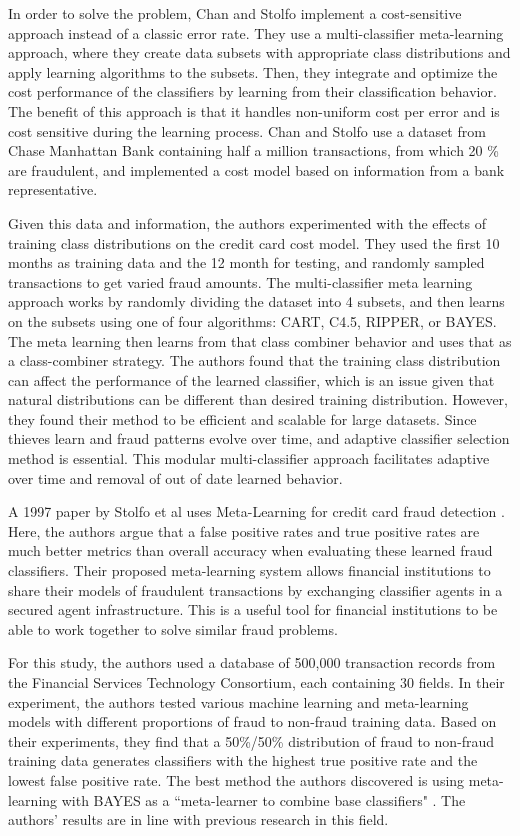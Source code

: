 \documentclass[midd]{thesis}
\begin{document}
In order to solve the problem, Chan and Stolfo implement a cost-sensitive approach instead of a classic error rate. They use a multi-classifier meta-learning approach, where they create data subsets with appropriate class distributions and apply learning algorithms to the subsets. Then, they integrate and optimize the cost performance of the classifiers by learning from their classification behavior. The benefit of this approach is that it handles non-uniform cost per error and is cost sensitive during the learning process. Chan and Stolfo use a dataset from Chase Manhattan Bank containing half a million transactions, from which 20 \% are fraudulent, and implemented a cost model based on information from a bank representative. 

Given this data and information, the authors experimented with the effects of training class distributions on the credit card cost model. They used the first 10 months as training data and the 12 month for testing, and randomly sampled transactions to get varied fraud amounts. The multi-classifier meta learning approach works by randomly dividing the dataset into 4 subsets, and then learns on the subsets using one of four algorithms: CART, C4.5, RIPPER, or BAYES. The meta learning then learns from that class combiner behavior and uses that as a class-combiner strategy. The authors found that the training class distribution can affect the performance of the learned classifier, which is an issue given that natural distributions can be different than desired training distribution. However, they found their method to be efficient and scalable for large datasets. Since thieves learn and fraud patterns evolve over time, and adaptive classifier selection method is essential. This modular multi-classifier approach facilitates adaptive over time and removal of out of date learned behavior.

A 1997 paper by Stolfo et al uses Meta-Learning for credit card fraud detection \cite{Stolfo1997}. Here, the authors argue that a false positive rates and true positive rates are much better metrics than overall accuracy when evaluating these learned fraud classifiers. Their proposed meta-learning system allows financial institutions to share their models of fraudulent transactions by exchanging classifier agents in a secured agent infrastructure. This is a useful tool for financial institutions to be able to work together to solve similar fraud problems. 

For this study, the authors used a database of 500,000 transaction records from the Financial Services Technology Consortium, each containing 30 fields. In their experiment, the authors tested various machine learning and meta-learning models with different proportions of fraud to non-fraud training data. Based on their experiments, they find that a 50\%/50\% distribution of fraud to non-fraud training data generates classifiers with the highest true positive rate and the lowest false positive rate. The best method the authors discovered is using meta-learning with BAYES as a ``meta-learner to combine base classifiers" \cite{Stolfo1997}. The authors' results are in line with previous research in this field. 
\end{document}
